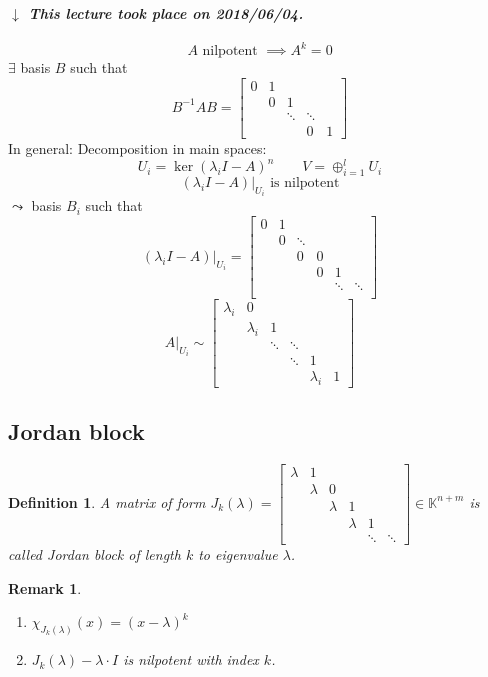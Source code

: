 \documentclass{article}
\newcounter{lecref}[section]
\numberwithin{lecref}{section}
\newtheorem{definition}[lecref]{Definition}
\newtheorem{remark}[lecref]{Remark}
\newcommand{\dateref}[1]{%
  \begin{mdframed}[backgroundcolor=gray!10,innerbottommargin=0pt,innertopmargin=0pt]
    \paragraph{\textit{$\downarrow$ This lecture took place on #1.}}%
  \end{mdframed}%
}
\begin{document}
\dateref{2018/06/04}

\[ A \text{ nilpotent } \implies A^k = 0 \]
$\exists$ basis $B$ such that 
\[ B^{-1}AB = \begin{bmatrix} 0 & 1 & & & \\ & 0 & 1 & & \\ & & \ddots & \ddots & \\ & & & 0 & 1 \end{bmatrix} \]
In general:
Decomposition in main spaces:
\[ U_i = \ker(\lambda_i I - A)^n \qquad V = \oplus_{i=1}^l U_i \] %
\[ (\lambda_i I - A)|_{U_i} \text{ is nilpotent} \]
$\leadsto$ basis $B_i$ such that
\[ (\lambda_i I - A)|_{U_i} = \begin{bmatrix}
  0 & 1 & & & & \\
  & 0 & \ddots & & & \\
  & & 0 & 0 & & \\
  & & & 0 & 1 & \\
  & & & & \ddots & \ddots \\
\end{bmatrix} \]
\[
  A|_{U_i} \sim
  \begin{bmatrix}
    \lambda_i & 0 & & & & \\
    & \lambda_i & 1 & & & \\
    & & \ddots & \ddots & & \\
    & & & \ddots & 1 & \\
    & & & & \lambda_i & 1
  \end{bmatrix}
\]

\subsection{Jordan block}

\begin{definition} %
  A matrix of form $J_k(\lambda) = \begin{bmatrix}
    \lambda & 1 & & & & \\
    & \lambda & 0 & & & \\
    & & \lambda & 1 & & \\
    & & & \lambda & 1 & \\
    & & & & \ddots & \ddots
  \end{bmatrix} \in \mathbb K^{n+m}$
  is called \emph{Jordan block} of length $k$ to eigenvalue $\lambda$.
\end{definition}

\begin{remark} %
  \begin{enumerate}
    \item $\chi_{J_k(\lambda)}(x) = (x - \lambda)^k$
    \item $J_k(\lambda) - \lambda \cdot I$ is nilpotent with index $k$.
  \end{enumerate}
\end{remark}
\end{document}
